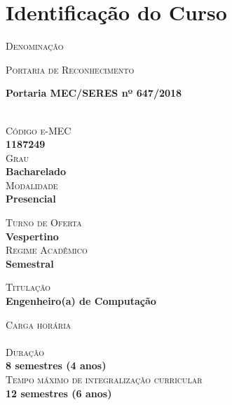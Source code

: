 \chapter{Identificação do Curso}


\begin{center}
\parbox{0.8\textwidth}{
    \textsc{\small \textcolor{AzulClaro}{Denominação}} \\ \hspace*{15mm} \parbox{0.45\textwidth}{\textbf{\ppccurso}\footnotemark}
}

\parbox{0.8\textwidth}{
    \textsc{\small \textcolor{AzulClaro}{Portaria de Reconhecimento}} \\ \hspace*{15mm} \parbox{0.45\textwidth}{\textbf{Portaria MEC/SERES nº 647/2018}}\\
    \textsc{\small \textcolor{AzulClaro}{Código e-MEC}} \\ \hspace*{15mm} \textbf{1187249}\\%
    \textsc{\small \textcolor{AzulClaro}{Grau}} \\ \hspace*{15mm} \textbf{Bacharelado}\\
    \textsc{\small \textcolor{AzulClaro}{Modalidade}} \\ \hspace*{15mm} \textbf{Presencial}\\
}
\parbox{0.8\textwidth}{
    \textsc{\small \textcolor{AzulClaro}{Turno de Oferta}} \\ \hspace*{15mm} \textbf{Vespertino\footnotemark}\\
    \textsc{\small \textcolor{AzulClaro}{Regime Acadêmico}} \\ \hspace*{15mm} \textbf{Semestral}
}

\parbox{0.8\textwidth}{
    \textsc{\small \textcolor{AzulClaro}{Titulação}} \\ \hspace*{15mm} \textbf{Engenheiro(a) de Computação} 
}

\parbox{0.8\textwidth}{
    \textsc{\small \textcolor{AzulClaro}{Carga horária}} \\ \hspace*{15mm} \textbf{}\\
    \textsc{\small \textcolor{AzulClaro}{Duração}} \\ \hspace*{15mm} \textbf{8 semestres (4 anos)}\\
    \textsc{\small \textcolor{AzulClaro}{Tempo máximo de integralização curricular}} \\ \hspace*{15mm} \textbf{12 semestres (6 anos)}\\
}
    

\end{center}
